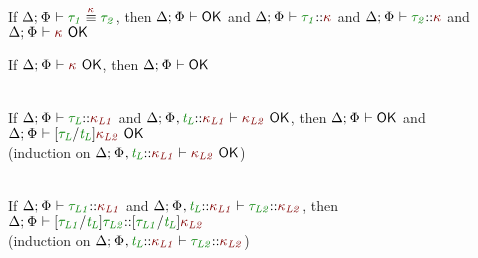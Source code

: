 \documentclass[11pt]{article}
\begin{document}
    \begin{lemma}[OK-TEquivAK]
        If $\TypeEquivAtKind{\typ[1]}{\typ[2]}$, then $\ContextWellFormed$ and $\WellFormedAtKind{\typ[1]}$ and $\WellFormedAtKind{\typ[2]}$ and $\KindWellFormed$
    \end{lemma}
    \begin{lemma}[OK-KWF]
        If $\KindWellFormed$, then $\ContextWellFormed$
    \end{lemma}
    \begin{lemma}[OK-Substitution]
        \vphantom{.}\\ If $\WellFormedAtKind{\typ[L]}[\knd[L1]]$ and $\KindWellFormed[{\knd[L2]}][\HoleCtx\ExtendTypVarCtx[][L][{\knd[L1]}]]$, then $\ContextWellFormed$ and $\KindWellFormed[\subst{\typ[L]}{\typvar[L]}{\knd[L2]}]$ \\
        (induction on $\KindWellFormed[{\knd[L2]}][\HoleCtx\ExtendTypVarCtx[][L][{\knd[L1]}]]$)
    \end{lemma}
    \begin{lemma}[K-Substitution]
        \vphantom{.}\\ If $\WellFormedAtKind{\typ[L1]}[\knd[L1]]$ and $\WellFormedAtKind[\HoleCtx\ExtendTypVarCtx[][L][{\knd[L1]}]]{\typ[L2]}[\knd[L2]]$, then $\WellFormedAtKind{\subst{\typ[L1]}{\typvar[L]}{\typ[L2]}}[\subst{\typ[L1]}{\typvar[L]}{\knd[L2]}]$ \\
        (induction on $\WellFormedAtKind[\HoleCtx\ExtendTypVarCtx[][L][{\knd[L1]}]]{\typ[L2]}[\knd[L2]]$)
    \end{lemma}
\end{document}
